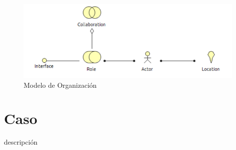
\begin{figure}[th!]
	\centering
	\includegraphics[width=0.7\linewidth]{arquitectura/negocio/imgs/m_organizacion}
	\caption{Modelo de Organización}
\end{figure}

\newpage
\section{Caso}
descripción

